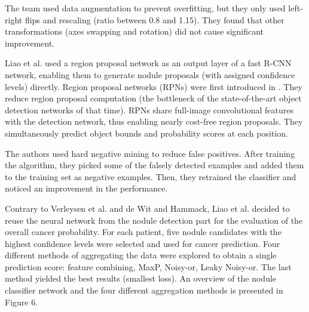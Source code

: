 \documentclass[12pt]{article}
\begin{document}
The team used data augmentation to prevent overfitting, but they only used left-right flips and rescaling (ratio between 0.8 and 1.15). They found that other transformations (axes swapping and rotation) did not cause significant improvement. 

Liao et al. used a region proposal network as an output layer of a fast R-CNN network, enabling them to generate nodule proposals (with assigned confidence levels) directly. Region proposal networks (RPNs) were first introduced in \citep{ren2015faster}. They reduce region proposal computation (the bottleneck of the state-of-the-art object detection networks of that time). RPNs share full-image convolutional features with the detection network, thus enabling nearly cost-free region proposals. They simultaneously predict object bounds and probability scores at each position. 


The authors used hard negative mining to reduce false positives. After training the algorithm, they picked some of the falsely detected examples and added them to the training set as negative examples. Then, they retrained the classifier and noticed an improvement in the performance.



Contrary to Verleysen et al. and de Wit and Hammack, Liao et al. decided to reuse the neural network from the nodule detection part for the evaluation of the overall cancer probability. For each patient, five nodule candidates with the highest confidence levels were selected and used for cancer prediction. Four different methods of aggregating the data were explored to obtain a single prediction score: feature combining, MaxP, Noisy-or, Leaky Noisy-or. The last method yielded the best results (smallest loss). An overview of the nodule classifier network and the four different aggregation methods is presented in Figure 6.
\end{document}

